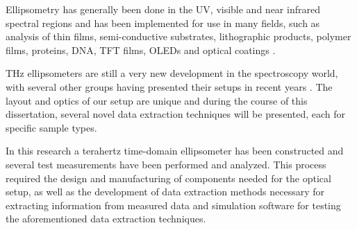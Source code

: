 Ellipsometry has generally been done in the UV, visible and near infrared spectral regions and has been implemented for use in many fields, such as analysis of thin films, semi-conductive substrates, lithographic products, polymer films, proteins, DNA, TFT films, OLEDs and optical coatings \cite{Neshat2013}.

THz ellipsometers are still a very new development in the spectroscopy world, with several other groups having presented their setups in recent years \cite{Neshat2013}.
The layout and optics of our setup are unique and during the course of this dissertation, several novel data extraction techniques will be presented, each for specific sample types.

In this research a terahertz time-domain ellipsometer has been constructed and several test measurements have been performed and analyzed. This process required the design and manufacturing of components needed for the optical setup, as well as the development of data extraction methods  necessary for extracting information from measured data and simulation software for testing the aforementioned data extraction techniques.

\endinput